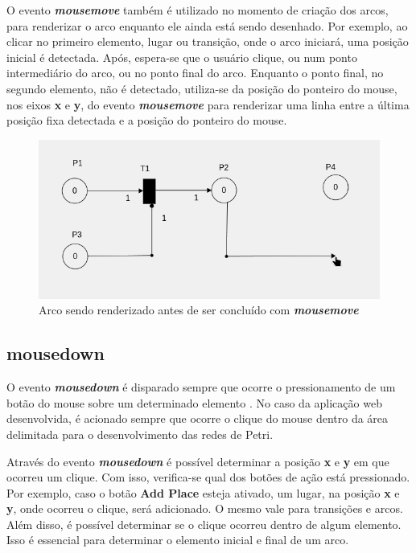 \documentclass[
	12pt,				%
	openright,			%
	oneside,			%
	a4paper,			%
	english,			%
	brazil				%
	]{abntex2}
\begin{document}
O evento \textbf{\textit{mousemove}} também é utilizado no momento de criação dos arcos, para renderizar o arco enquanto ele ainda está sendo desenhado. Por exemplo, ao clicar no primeiro elemento, lugar ou transição, onde o arco iniciará, uma posição inicial é detectada. Após, espera-se que o usuário clique, ou num ponto intermediário do arco, ou no ponto final do arco. Enquanto o ponto final, no segundo elemento, não é detectado, utiliza-se da posição do ponteiro do mouse, nos eixos \textbf{x} e \textbf{y}, do evento \textbf{\textit{mousemove}} para renderizar uma linha entre a última posição fixa detectada e a posição do ponteiro do mouse.

\begin{figure}[ht] 
	\centering
	\includegraphics[scale=0.4]{figuras/mousemove_desenhando_arco.png}
	\caption[Mousemove desenhando arco]{Arco sendo renderizado antes de ser concluído com \textbf{\textit{mousemove}}}
	\label{fig:mousemove_desenhando_arco}
\end{figure}

\subsection*{mousedown}\label{cap:mousedown}

O evento \textbf{\textit{mousedown}} é disparado sempre que ocorre o pressionamento de um botão do mouse sobre um determinado elemento \cite{mdn_mousedown_event}. No caso da aplicação web desenvolvida, é acionado sempre que ocorre o clique do mouse dentro da área delimitada para o desenvolvimento das redes de Petri. 



Através do evento \textbf{\textit{mousedown}} é possível determinar a posição \textbf{x} e \textbf{y} em que ocorreu um clique. Com isso, verifica-se qual dos botões de ação está pressionado. Por exemplo, caso o botão \textbf{Add Place} esteja ativado, um lugar, na posição \textbf{x} e \textbf{y}, onde ocorreu o clique, será adicionado. O mesmo vale para transições e arcos. Além disso, é possível determinar se o clique ocorreu dentro de algum elemento. Isso é essencial para determinar o elemento inicial e final de um arco. 
\end{document}
